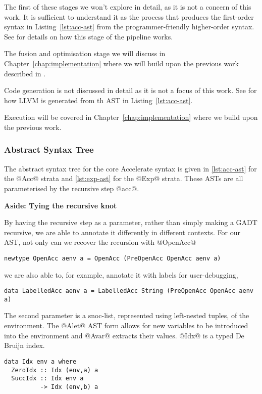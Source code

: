 The first of these stages we won't explore in detail, as it is not a concern of this work. It is sufficient to understand it as the process that produces the first-order syntax in Listing~\ref{lst:acc-ast} from the programmer-friendly higher-order syntax. See \citet{McDonell:acc-optim} for details on how this stage of the pipeline works.

The fusion and optimisation stage we will discuss in Chapter~\ref{chap:implementation} where we will build upon the previous work described in \citet{McDonell:acc-optim}.

Code generation is not discussed in detail as it is not a focus of this work. See \citet{McDonell:2015:acc-llvm} for how LLVM is generated from th AST in Listing~\ref{lst:acc-ast}.

Execution will be covered in Chapter~\ref{chap:implementation} where we build upon the previous work\cite{McDonell:acc-optim,McDonell:2015:acc-llvm,Chakravarty:acc-cuda}.

\subsubsection{Abstract Syntax Tree}

The abstract syntax tree for the core Accelerate syntax is given in \ref{lst:acc-ast} for the @Acc@ strata and \ref{lst:exp-ast} for the @Exp@ strata. These ASTs are all parameterised by the recursive step @acc@.

\begin{aside}
\begin{center}
\textbf{Aside: Tying the recursive knot}
\end{center}

By having the recursive step as a parameter, rather than simply making a GADT recursive, we are able to annotate it differently in different contexts. For our AST, not only can we recover the recursion with @OpenAcc@
%
\begin{lstlisting}
newtype OpenAcc aenv a = OpenAcc (PreOpenAcc OpenAcc aenv a)
\end{lstlisting}
%
we are also able to, for example, annotate it with labels for user-debugging,
%
\begin{lstlisting}
data LabelledAcc aenv a = LabelledAcc String (PreOpenAcc OpenAcc aenv a)
\end{lstlisting}
\end{aside}

The second parameter is a snoc-list, represented using left-nested tuples, of the environment. The @Alet@ AST form allows for new variables to be introduced into the environment and @Avar@ extracts their values. @Idx@ is a typed De Bruijn index.
%
\begin{lstlisting}
data Idx env a where
  ZeroIdx :: Idx (env,a) a
  SuccIdx :: Idx env a
          -> Idx (env,b) a
\end{lstlisting}
%

